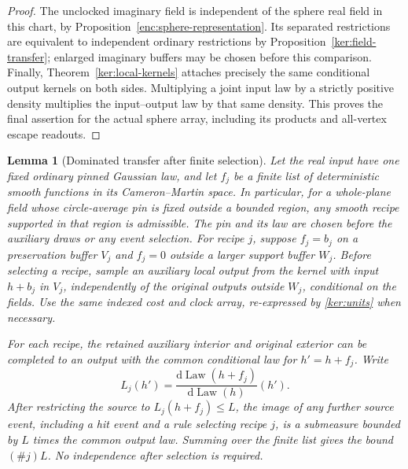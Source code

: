 \documentclass[11pt]{article}
\numberwithin{equation}{section}
\newtheorem{lemma}[theorem]{Lemma}
\theoremstyle{definition}
\theoremstyle{remark}
\newcommand{\dd}{\mathrm d}
\newcommand{\1}{\mathbf 1}
\DeclareMathOperator{\Law}{Law}
\begin{document}
\begin{proof}
The unclocked imaginary field is independent of the sphere real
field in this chart, by Proposition~\ref{enc:sphere-representation}.
Its separated restrictions are equivalent to independent ordinary
restrictions by Proposition~\ref{ker:field-transfer}; enlarged
imaginary buffers may be chosen before this comparison.  Finally,
Theorem~\ref{ker:local-kernels} attaches precisely the same conditional
output kernels on both sides.  Multiplying a joint input law by a
strictly positive density multiplies the input--output law by that
same density.  This proves the final assertion for the actual sphere
array, including its products and all-vertex escape readouts.
\end{proof}

\begin{lemma}[Dominated transfer after finite selection]
\label{ker:selected-transfer}
Let the real input have one fixed ordinary pinned Gaussian law, and
let \(f_j\) be a finite list of deterministic smooth functions in its
Cameron--Martin space. In particular, for a whole-plane field whose
circle-average pin is fixed outside a bounded region, any smooth
recipe supported in that region is admissible. The pin and its law
are chosen before the auxiliary draws or any event selection.
For recipe \(j\), suppose \(f_j=b_j\) on a preservation buffer
\(V_j\) and \(f_j=0\) outside a larger support buffer \(W_j\).
Before selecting a recipe, sample an auxiliary local output from the
kernel with input \(h+b_j\) in \(V_j\), independently of the original
outputs outside \(W_j\), conditional on the fields.  Use the same
indexed cost and clock array, re-expressed by \eqref{ker:units} when
necessary.

For each recipe, the retained auxiliary interior and original exterior
can be completed to an output with the common conditional law for
\(h'=h+f_j\).  Write
\[
 L_j(h')=\frac{\dd\Law(h+f_j)}{\dd\Law(h)}(h').
\]
After restricting the source to \(L_j(h+f_j)\le L\), the image of
\emph{any} further source event, including a hit event and a rule
selecting recipe \(j\), is a submeasure bounded by \(L\) times the
common output law.  Summing over the finite list gives the bound
\((\#j)L\).  No independence after selection is required.
\end{lemma}
\end{document}

